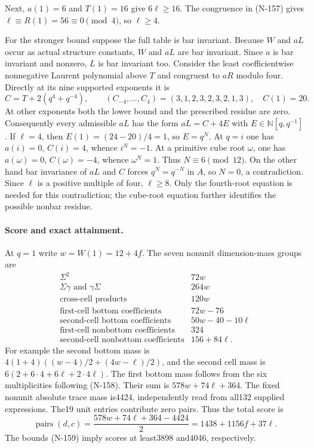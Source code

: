 Next, $a(1)=6$ and $T(1)=16$ give $6\ell\ge16$.
The congruence in (N-157) gives $\ell\equiv R(1)=56\equiv0\pmod4$,
so $\ell\ge4$.

For the stronger bound suppose the full table is bar invariant.
Because $W$ and $aL$ occur as actual structure constants, $W$ and
$aL$ are bar invariant.  Since $a$ is bar invariant and nonzero,
$L$ is bar invariant too.  Consider the least coefficientwise
nonnegative Laurent polynomial above $T$ and congruent to $aR$
modulo four.  Directly at its nine supported exponents it is
\[
 C=T+2(q^4+q^{-4}),\qquad
 (C_{-4},\ldots,C_4)=(3,1,2,3,2,3,2,1,3),\quad C(1)=20.
 \tag{N-160}
\]
At other exponents both the lower bound and the prescribed residue
are zero.  Consequently every admissible $aL$ has the form
$aL=C+4E$ with $E\in\mathbb N[q,q^{-1}]$.
If $\ell=4$, then $E(1)=(24-20)/4=1$, so $E=q^N$.
At $q=i$ one has $a(i)=0$, $C(i)=4$, whence $i^N=-1$.
At a primitive cube root $\omega$, one has $a(\omega)=0$,
$C(\omega)=-4$, whence $\omega^N=1$.
Thus $N\equiv6\pmod{12}$.  On the other hand bar invariance of
$aL$ and $C$ forces $q^N=q^{-N}$ in $A$, so $N=0$, a contradiction.
Since $\ell$ is a positive multiple of four, $\ell\ge8$.
Only the fourth-root equation is needed for this contradiction;
the cube-root equation further identifies the possible nonbar residue.

\paragraph{Score and exact attainment.}
At $q=1$ write $w=W(1)=12+4f$.  The seven nonunit dimension-mass
groups are
\[
\begin{array}{c|r}
\Sigma^2&72w\\
\Sigma\gamma\text{ and }\gamma\Sigma&264w\\
\text{cross-cell products}&120w\\
\text{first-cell bottom coefficients}&72w-76\\
\text{second-cell bottom coefficients}&50w-40-10\ell\\
\text{first-cell nonbottom coefficients}&324\\
\text{second-cell nonbottom coefficients}&156+84\ell.
\end{array}\tag{N-161}
\]
For example the second bottom mass is
$4(1+4)((w-4)/2+(4w-\ell)/2)$, and the second cell mass is
$6(2+6\cdot4+6\ell+2\cdot4\ell)$.
The first bottom mass follows from the six multiplicities following
(N-158).  Their sum is $578w+74\ell+364$.
The fixed nonunit absolute trace mass is4424, independently read
from all132 supplied expressions.  The19 unit entries contribute
zero pairs.  Thus the total score is
\[
 \operatorname{pairs}(d,c)
    =\frac{578w+74\ell+364-4424}{2}
    =1438+1156f+37\ell.
 \tag{N-162}
\]
The bounds (N-159) imply scores at least3898 and4046, respectively.


